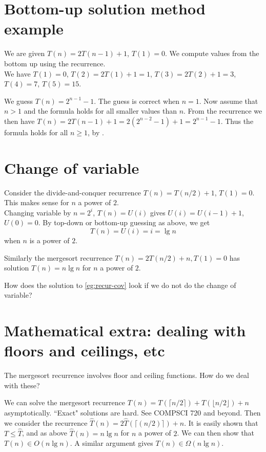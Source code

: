 \section{Bottom-up solution method example}
\begin{Boxample}
We are given $T(n) = 2 T(n - 1) + 1$, $T(1) = 0$. 
We compute values from the bottom up using the recurrence.\\


We have $T(1) = 0$, $T(2) = 2T(1) + 1 = 1$, $T(3) = 2T(2) + 1 = 3$, $T(4) = 7$, $T(5) = 15$. 

We guess $T(n) = 2^{n-1} - 1$. The guess is correct when $n = 1$.
Now assume that $n > 1$ and the formula holds for all smaller values than $n$. 
From the recurrence we then have 
$T(n) = 2T(n-1) + 1 = 2(2^{n-2} - 1) + 1 = 2^{n-1} - 1$. 
Thus the formula holds for all $n \geq 1$, by .
\end{Boxample}

\section{Change of variable}
\begin{Boxample} \label{eg:recur-cov}
Consider the divide-and-conquer recurrence $T(n) = T(n/2) + 1$, $T(1) = 0$. 
This makes sense for $n$ a power of $2$.\\

Changing variable by $n = 2^i$, $T(n) = U(i)$ 
gives $U(i) = U(i-1) + 1$, $U(0) = 0$. 
By top-down or bottom-up guessing as above, we get 
$$T(n) = U(i) =  i = \lg n$$ when $n$ is a power of $2$.

Similarly the mergesort recurrence $T(n) = 2T(n/2) + n, T(1)  = 0$ 
has solution $T(n) = n \lg n$ for $n$ a power of $2$.
\end{Boxample}

\begin{Boxample}[6]
How does the solution to \cref{eg:recur-cov} look if we do not do the change of variable?
\end{Boxample}

\section{Mathematical extra: dealing with floors and ceilings, etc}
The mergesort recurrence involves floor and ceiling functions. How do we deal with these?

We can solve the mergesort recurrence $T(n) = T(\lceil n/2 \rceil) + T(\lfloor n/2 \rfloor) + n$ asymptotically. 
``Exact" solutions are hard. See COMPSCI 720 and beyond. Then we consider the recurrence $\hat{T}(n) =
2\hat{T}(\lceil(n/2)\rceil) + n$. It is easily shown that $T \leq \hat{T}$, and 
as above $\hat{T}(n) = n \lg n$ for $n$ a power of $2$. We can then show that $T(n)
\in O(n \lg n)$. A similar argument gives $T(n) \in \Omega(n \lg n)$.


